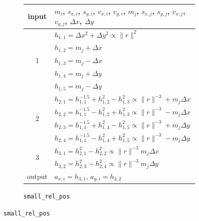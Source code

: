 \documentclass{article}
\begin{document}
\begin{figure}[H]
\centering
\begin{subfigure}{\textwidth}
\centering
\begin{tabular}{c|l}
input & $m_{i}$, $s_{x,i}$, $s_{y,i}$, $v_{x,i}$, $v_{y,i}$, $m_{j}$, $s_{x,j}$, $s_{y,j}$, $v_{x,j}$, $v_{y,j}$, $\Delta x$, $\Delta y$ \\
\hline
\multirow{5}{*}{1} & $h_{1,1} = \Delta x^{2} + \Delta y^{2} \propto \|r\|^{2}$ \\
& $h_{1,2} = m_{j} + \Delta x$ \\
& $h_{1,3} = m_{j} - \Delta x$ \\
& $h_{1,4} = m_{j} + \Delta y$ \\
& $h_{1,5} = m_{j} - \Delta y$ \\
\hline
\multirow{4}{*}{2} & $h_{2, 1} = h_{1,1}^{-1.5} + h_{1,2}^{2} - h_{1,3}^{2} \propto \|r\|^{-3} + m_{j} \Delta x$ \\
& $h_{2, 2} = h_{1,1}^{-1.5} - h_{1,2}^{2} + h_{1,3}^{2} \propto \|r\|^{-3} - m_{j} \Delta x$ \\
& $h_{2, 3} = h_{1,1}^{-1.5} + h_{1,4}^{2} - h_{1,5}^{2} \propto \|r\|^{-3} + m_{j} \Delta y$ \\
& $h_{2, 4} = h_{1,1}^{-1.5} - h_{1,4}^{2} + h_{1,5}^{2} \propto \|r\|^{-3} - m_{j} \Delta y$ \\
\hline
\multirow{2}{*}{3} & $h_{3,1} = h_{2,1}^{2} - h_{2,2}^{2} \propto \|r\|^{-3} m_{j} \Delta x$ \\
& $h_{3,2} = h_{2,3}^{2} - h_{2,4}^{2} \propto \|r\|^{-3} m_{j} \Delta y$ \\
\hline
output & $a_{x,i} = h_{3,1}$, $a_{y,i} = h_{3,2}$ \\
\end{tabular}
\caption{\texttt{small\_rel\_pos}}
\label{fig:feasible-route-small-rel-pos}
\end{subfigure}



\end{figure}
\end{document}
